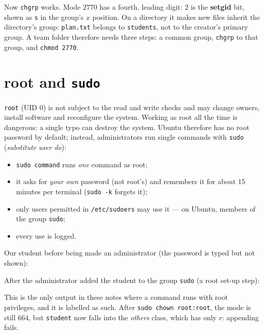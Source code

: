 \documentclass[11pt,a4paper]{article}
\newcommand{\term}[1]{\textbf{\color{mintdeep}#1}}
\newcommand{\cmd}[1]{\texttt{#1}}
\begin{document}


Now \cmd{chgrp} works. Mode $2770$ has a fourth, leading digit: $2$ is the \term{setgid} bit, shown as \texttt{s} in the group's $x$ position. On a directory it makes new files inherit the directory's group: \texttt{plan.txt} belongs to \texttt{students}, not to the creator's primary group. A team folder therefore needs three steps: a common group, \cmd{chgrp} to that group, and \cmd{chmod 2770}.

\section{root and \cmd{sudo}}

\texttt{root} (UID $0$) is not subject to the read and write checks and may change owners, install software and reconfigure the system. Working as root all the time is dangerous: a single typo can destroy the system. Ubuntu therefore has no root password by default; instead, administrators run single commands with \cmd{sudo} (\emph{substitute user do}):
\begin{itemize}
  \item \cmd{sudo command} runs \emph{one} command as root;
  \item it asks for \emph{your own} password (not root's) and remembers it for about $15$ minutes per terminal (\cmd{sudo -k} forgets it);
  \item only users permitted in \texttt{/etc/sudoers} may use it --- on Ubuntu, members of the group \texttt{sudo};
  \item every use is logged.
\end{itemize}

Our student before being made an administrator (the password is typed but not shown):



After the administrator added the student to the group \texttt{sudo} (a root set-up step):



This is the only output in these notes where a command runs with root privileges, and it is labelled as such. After \cmd{sudo chown root:root}, the mode is still $664$, but \texttt{student} now falls into the \emph{others} class, which has only $r$: appending fails.
\end{document}
